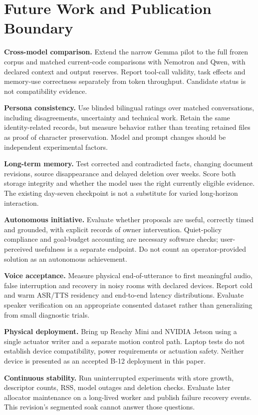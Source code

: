 \documentclass[11pt,a4paper]{article}
\begin{document}
\section{Future Work and Publication Boundary}
\textbf{Cross-model comparison.} Extend the narrow Gemma pilot to the full frozen corpus and matched current-code comparisons with Nemotron and Qwen, with declared context and output reserves. Report tool-call validity, task effects and memory-use correctness separately from token throughput. Candidate status is not compatibility evidence.

\textbf{Persona consistency.} Use blinded bilingual ratings over matched conversations, including disagreements, uncertainty and technical work. Retain the same identity-related records, but measure behavior rather than treating retained files as proof of character preservation. Model and prompt changes should be independent experimental factors.

\textbf{Long-term memory.} Test corrected and contradicted facts, changing document revisions, source disappearance and delayed deletion over weeks. Score both storage integrity and whether the model uses the right currently eligible evidence. The existing day-seven checkpoint is not a substitute for varied long-horizon interaction.

\textbf{Autonomous initiative.} Evaluate whether proposals are useful, correctly timed and grounded, with explicit records of owner intervention. Quiet-policy compliance and goal-budget accounting are necessary software checks; user-perceived usefulness is a separate endpoint. Do not count an operator-provided solution as an autonomous achievement.

\textbf{Voice acceptance.} Measure physical end-of-utterance to first meaningful audio, false interruption and recovery in noisy rooms with declared devices. Report cold and warm ASR/TTS residency and end-to-end latency distributions. Evaluate speaker verification on an appropriate consented dataset rather than generalizing from small diagnostic trials.

\textbf{Physical deployment.} Bring up Reachy Mini and NVIDIA Jetson using a single actuator writer and a separate motion control path. Laptop tests do not establish device compatibility, power requirements or actuation safety. Neither device is presented as an accepted B-12 deployment in this paper.

\textbf{Continuous stability.} Run uninterrupted experiments with store growth, descriptor counts, RSS, model outages and deletion checks. Evaluate later allocator maintenance on a long-lived worker and publish failure recovery events. This revision's segmented soak cannot answer those questions.
\end{document}
